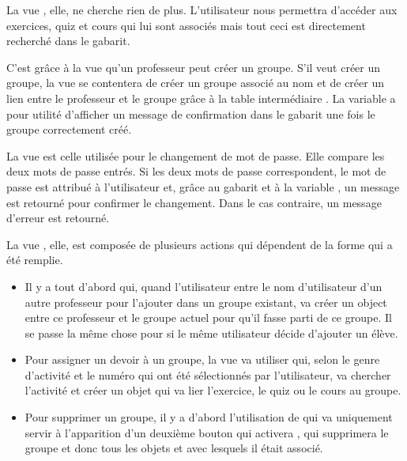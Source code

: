 \documentclass[a4paper,10pt,french]{sphinxmanual}
\begin{document}
La vue , elle, ne cherche rien de plus. L'utilisateur nous
permettra d'accéder aux exercices, quiz et cours qui lui sont associés mais
tout ceci est directement recherché dans le gabarit.

C'est grâce à la vue  qu'un professeur peut créer un groupe. S'il
veut créer un groupe, la vue se contentera de créer un groupe associé au nom
et de créer un lien entre le professeur et le groupe grâce à la table
intermédiaire . La variable  a pour utilité
d'afficher un message de confirmation dans le gabarit  une
fois le groupe correctement créé.

La vue  est celle utilisée pour le changement de mot de passe. Elle
compare les deux mots de passe entrés. Si les deux mots de passe correspondent,
le mot de passe est attribué à l'utilisateur et, grâce au gabarit
 et à la variable , un message est retourné pour
confirmer le changement. Dans le cas contraire, un message d'erreur est
retourné.

La vue , elle, est composée de plusieurs actions qui dépendent de la
forme qui a été remplie.
\begin{itemize}
\item {} 
Il y a tout d'abord  qui, quand l'utilisateur entre le nom
d'utilisateur d'un autre professeur pour l'ajouter dans un groupe existant,
va créer un object  entre ce professeur et le groupe actuel
pour qu'il fasse parti de ce groupe. Il se passe la même chose pour
 si le même utilisateur décide d'ajouter un élève.

\item {} 
Pour assigner un devoir à un groupe, la vue va utiliser 
qui, selon le genre d'activité et le numéro qui ont été sélectionnés par
l'utilisateur, va chercher l'activité et créer un objet 
qui va lier l'exercice, le quiz ou le cours au groupe.

\item {} 
Pour supprimer un groupe, il y a d'abord l'utilisation de 
qui va uniquement servir à l'apparition d'un deuxième bouton qui activera
, qui supprimera le groupe et donc tous les objets
 et  avec lesquels il était associé.

\end{itemize}
\end{document}
